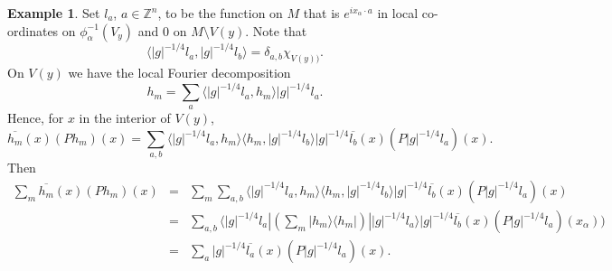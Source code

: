 \documentclass[final,1p]{elsarticle}
\numberwithin{equation}{section}
\theoremstyle{plain}
\theoremstyle{definition}
\newtheorem{ex}[thm]{Example}
\begin{document}
\begin{ex}
Set $l_a$, $a \in {\ensuremath{\mathbb{Z}}}^n$, to be the function on
$M$ that is $e^{i x_\alpha \cdot a}$ in local co-ordinates on $\phi_\alpha^{-1}(V_y)$ and $0$ on $M \setminus V(y)$.
Note that
$$
{\ensuremath{\langle {|g|^{-1/4}l_{a}} , {|g|^{-1/4}l_{b}} \rangle}}
= \delta_{a,b} \chi_{V(y))} .
$$
On $V(y)$ we have the local Fourier decomposition
$$
h_m = \sum_{a} {\ensuremath{\langle {|g|^{-1/4}l_a} , {h_m} \rangle}}
|g|^{-1/4} l_a .
$$
Hence, for $x$ in the interior of $V(y)$,
$$
\overline{h_m}(x)(P h_m)(x)
= \sum_{a,b} {\ensuremath{\langle {|g|^{-1/4}l_a} , {h_m} \rangle}}
{\ensuremath{\langle {h_m} , {|g|^{-1/4}l_b} \rangle}}
|g|^{-1/4} \overline{l_b}(x) (P|g|^{-1/4}l_a)(x) .
$$
Then
\begin{eqnarray*}
\sum_m \overline{h_m}(x)(P h_m)(x)
& = & \sum_m \sum_{a,b} {\ensuremath{\langle {|g|^{-1/4}l_a} , {h_m} \rangle}}
{\ensuremath{\langle {h_m} , {|g|^{-1/4}l_b} \rangle}}
|g|^{-1/4} \overline{l_b}(x) (P|g|^{-1/4}l_a)(x) \\
& =  & \sum_{a,b} \langle |g|^{-1/4}l_a |
\left( \sum_m | h_m \rangle \langle h_m | \right)
| |g|^{-1/4}l_a \rangle
|g|^{-1/4} \overline{l_b}(x) (P|g|^{-1/4}l_a)(x_\alpha)) \\
& =  & \sum_{a} |g|^{-1/4} \overline{l_a}(x) (P|g|^{-1/4}l_a)(x) .
\end{eqnarray*}


\end{ex}
\end{document}
